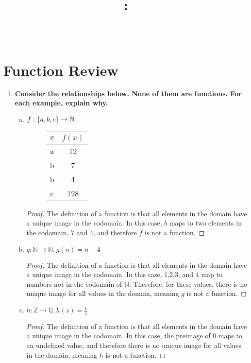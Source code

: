 \documentclass[article, 12pt]{article}
\title{
    \vspace{2in}
    \textmd{\textbf{\courseNumber: \courseName}}
    \normalsize\vspace{0.1in}\\
    \vspace{0.1in}\Large{\text{\psetName}} \\
    \vspace{0.1in}\large{\text{\professor}}
    \vspace{3in}
}
\author{\name}
\date{\dueDate}
\theoremstyle{definition}
\newcommand{\df}{\displaystyle\frac} %
\DeclarePairedDelimiter\set{\{}{\}}
\newcommand{\ints}{\mathbb{Z}}
\newcommand{\nats}{\mathbb{N}}
\newcommand{\rats}{\mathbb{Q}}
\begin{document}
    \maketitle
    \thispagestyle{empty}
    \pagebreak

    \section{Function Review}
    \begin{enumerate}[(1)] \label{q:1}
        \item \textbf{Consider the relationships below. None of them are functions. For each example, explain why.}
        \begin{enumerate}[(a)]
            \item $f: \set*{a, b, c} \to \nats$ 
            \begin{figure}[H]
                \centering
                \begin{tabular}{c|c}
                    $x$ & $f(x)$ \\
                    \hline
                    a & 12 \\
                    b & 7 \\
                    b & 4 \\
                    c & 128
                \end{tabular}
            \end{figure}
            \begin{proof}
                The definition of a function is that all elements in the domain have a unique image in the codomain. In this case, $b$ maps to two elements in the codomain, $7$ and $4$, and therefore $f$ is not a function.
            \end{proof}
            \item $g: \nats \to \nats , g(n) = n-4$
            \begin{proof}
                The definition of a function is that all elements in the domain have a unique image in the codomain. In this case, 1,2,3, and 4 map to numbers not in the codomain of $\nats$. Therefore, for these values, there is no unique image for all values in the domain, meaning $g$ is not a function.
            \end{proof}
            \item $h: \ints \to \rats, h(z) = \df{1}{z}$
            \begin{proof}
                The definition of a function is that all elements in the domain have a unique image in the codomain. In this case, the preimage of 0 maps to an undefined value, and therefore there is no unique image for all values in the domain, meaning $h$ is not a function.

\end{proof}
\end{enumerate}
\end{enumerate}
\end{document}
